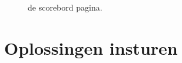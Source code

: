 \begin{figure}[p]
  \centering
  \caption{de scorebord pagina.}
  \label{fig:team-scoreboard}
\end{figure}

\newpage

\section{Oplossingen insturen}\label{submit}

